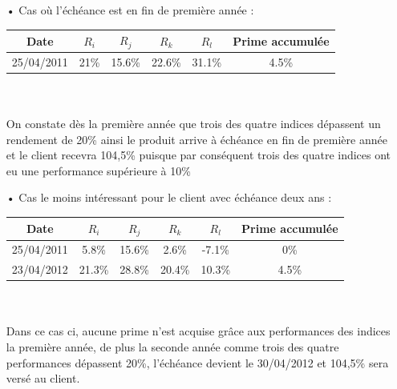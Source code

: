 \documentclass[french,12pt,a4paper]{article}
\begin{document}
\begin{itemize}

\item[•]
Cas où l'échéance est en fin de première année :\\

\begin{spacing}{1.2}
\begin{center}
\begin{tabular}{|c|c|c|c|c|c|}
  \hline
  Date & $R_{i}$ & $R_{j}$ & $R_{k}$ & $R_{l}$ & Prime accumulée \\
  \hline
  25/04/2011 & 21\% & 15.6\% & 22.6\% & 31.1\% & 4.5\%\\
  \hline
\end{tabular}
\end{center}
\end{spacing}
\indent \\
\indent \\
On constate dès la première année que trois des quatre indices dépassent un rendement de 20\% ainsi le produit arrive à échéance en fin de première année et le client recevra 104,5\% puisque par conséquent trois des quatre indices ont eu une performance supérieure à 10\% \\

\item[•]
Cas le moins intéressant pour le client avec échéance deux ans :\\

\begin{spacing}{1.2}
\begin{center}
\begin{tabular}{|c|c|c|c|c|c|}
  \hline
  Date & $R_{i}$ & $R_{j}$ & $R_{k}$ & $R_{l}$ & Prime accumulée \\
  \hline
  25/04/2011 & 5.8\% & 15.6\% & 2.6\% & -7.1\% & 0\%\\
  23/04/2012 & 21.3\% & 28.8\% & 20.4\% & 10.3\% & 4.5\%\\
  \hline
\end{tabular}
\end{center}
\end{spacing}
\indent \\
\indent \\
Dans ce cas ci, aucune prime n'est acquise grâce aux performances des indices la première année, de plus la seconde année comme trois des quatre performances dépassent 20\%, l'échéance devient le 30/04/2012 et 104,5\% sera versé au client.\\


\end{itemize}
\end{document}
